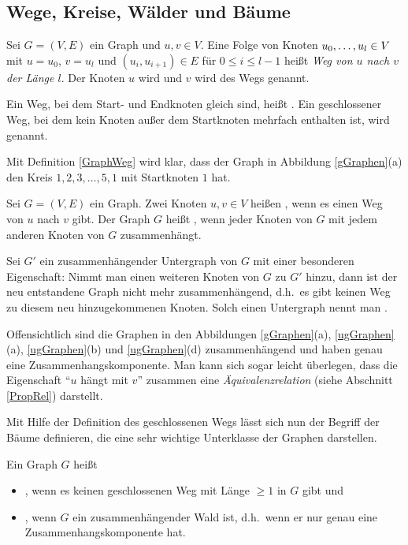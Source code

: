 \subsection{Wege, Kreise, Wälder und Bäume}

\begin{definition}
\label{GraphWeg}
Sei $G=(V,E)$ ein Graph und $u,v \in V$. Eine Folge von Knoten
${u_{0}}, \allowbreak \dots , \allowbreak{u_{l}} \in V$ mit $u = u_0$, $v = u_l$ und $(u_i,u_{i+1}) \in
E$ für $0 \le i \le l - 1$ heißt \emph{Weg von $u$ nach $v$ der Länge
$l$}. Der Knoten $u$
wird  und $v$
wird  des Wegs genannt.

Ein Weg, bei dem Start- und Endknoten gleich sind,
heißt . Ein
geschlossener Weg, bei dem kein Knoten außer dem Startknoten mehrfach
enthalten ist, wird  genannt.
\end{definition}
Mit Definition \ref{GraphWeg} wird klar, dass der Graph in
Abbildung \ref{gGraphen}(a) den Kreis $1,2,3,\dots,\allowbreak 5,1$ mit
Startknoten $1$ hat.

\begin{definition}
Sei $G=(V,E)$ ein Graph. Zwei Knoten $u,v \in V$
heißen , wenn es einen Weg von $u$ nach $v$
gibt. Der Graph $G$ heißt , wenn jeder Knoten
von $G$ mit jedem anderen Knoten von $G$ zusammenhängt. 

Sei $G'$ ein zusammenhängender Untergraph von $G$ mit einer besonderen
Eigenschaft: Nimmt man einen weiteren Knoten von $G$ zu $G'$ hinzu,
dann ist der neu entstandene Graph nicht mehr zusammenhängend, d.h.~es
gibt keinen Weg zu diesem neu hinzugekommenen Knoten. Solch einen
Untergraph nennt man .
\end{definition}
Offensichtlich sind die Graphen in den
Abbildungen \ref{gGraphen}(a), \ref{ugGraphen}(a), \ref{ugGraphen}(b)
und \ref{ugGraphen}(d) zusammenhängend und haben genau eine
Zusammenhangskomponente. Man kann sich sogar leicht überlegen, dass
die Eigenschaft "`$u$ hängt mit $v$"' zusammen
eine \emph{Äquivalenzrelation} (siehe Abschnitt \ref{PropRel})
darstellt.

Mit Hilfe der Definition des geschlossenen Wegs lässt sich nun der
Begriff der Bäume definieren, die eine sehr wichtige Unterklasse der
Graphen darstellen.
\goodbreak
\begin{definition}
Ein Graph $G$ heißt
\begin{itemize}
%
\item {}, wenn es keinen geschlossenen Weg mit Länge $\ge
1$ in $G$ gibt und 
%
\item {}, wenn $G$ ein zusammenhängender Wald ist,
d.h.~wenn er nur genau eine Zusammenhangskomponente hat.
%
\end{itemize}
\end{definition}

